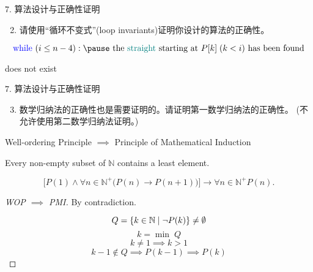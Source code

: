 \begin{frame}{}
  \begin{exampleblock}{$7.$ 算法设计与正确性证明}
    \begin{enumerate}[(1)]
      \setcounter{enumi}{1}
      \item 请使用``循环不变式''\;(loop invariants)证明你设计的算法的正确性。
    \end{enumerate}
  \end{exampleblock}

  \pause

  \pause
  \vspace{-0.80cm}
  \[
    \text{\blue{while} } (i \le n - 4): \pause \text{ the \teal{straight} starting at } P[k]\;(k < i) \text{ has been found}
  \]
  \pause
  \centerline{ does not exist}
\end{frame}

\begin{frame}{}
  \begin{exampleblock}{$7.$ 算法设计与正确性证明}
    \begin{enumerate}[(1)]
      \setcounter{enumi}{2}
      \item 数学归纳法的正确性也是需要证明的。请证明第一数学归纳法的正确性。 
	(不允许使用第二数学归纳法证明。)
    \end{enumerate}
  \end{exampleblock}

  \pause
  \vspace{0.60cm}
  \centerline{Well-ordering Principle $\implies$ Principle of Mathematical Induction}
\end{frame}

\begin{frame}{}
  \begin{definition}
    Every non-empty subset of $\mathbb{N}$ contains a least element.
  \end{definition}

  \pause
  \vspace{0.20cm}
  \begin{definition}
  \[
    \Big[ P(1) \land \forall n \in \mathbb{N}^{+} \big(P(n) \to P(n+1) \big) \Big]
      \to \forall n \in \mathbb{N}^{+} P(n).
  \]
  \end{definition}

  \pause
  \begin{proof}[WOP $\implies$ PMI]
    \centerline{\large By contradiction.}

    \pause
    \[
      Q = \{k \in \mathbb{N} \mid \lnot P(k)\} \neq \emptyset
    \]
    \pause
    \vspace{-0.50cm}
    \[
      k = \min\; Q
    \]
    \pause
    \vspace{-0.50cm}
    \[
      k \neq 1 \implies k > 1 
    \]
    \pause
    \vspace{-0.50cm}
    \[
      k-1 \notin Q \implies P(k-1) \implies P(k)
    \]
  \end{proof}
\end{frame}
